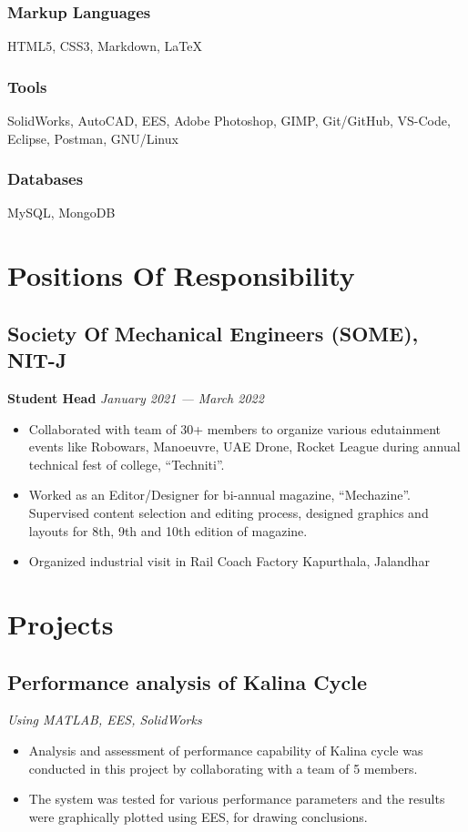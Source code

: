 \documentclass[a4paper]{article}
\begin{document}
\subsubsection*{Markup Languages}
HTML5, CSS3, Markdown, \LaTeX
\vspace{-10pt}
\subsubsection*{Tools}
SolidWorks, AutoCAD, EES, Adobe Photoshop, GIMP, Git/GitHub, VS-Code, Eclipse, Postman, GNU/Linux
\vspace{-10pt}
\subsubsection*{Databases}
MySQL, MongoDB

\section{Positions Of Responsibility}
\subsection{Society Of Mechanical Engineers (SOME), NIT-J }
\textbf{Student Head}
\hfill
\textit{January 2021 --- March 2022}
\begin{itemize}
	\item Collaborated with team of 30+ members to organize various edutainment events like Robowars, Manoeuvre, UAE Drone, Rocket League during annual technical fest of college, “Techniti”.
	\item Worked as an Editor/Designer for bi-annual magazine, “Mechazine”. Supervised content selection and editing process, designed graphics and layouts for 8th, 9th and 10th edition of magazine.
	\item Organized industrial visit in Rail Coach Factory Kapurthala, Jalandhar
\end{itemize}

\section{Projects}

\subsection{Performance analysis of Kalina Cycle}
\textit{Using MATLAB, EES, SolidWorks}
\begin{itemize}
	\item Analysis and assessment of performance capability of Kalina cycle was conducted in this project by collaborating with a team of 5 members.
	\item The system was tested for various performance parameters and the results were graphically plotted using EES, for drawing conclusions.
\end{itemize}
\end{document}

